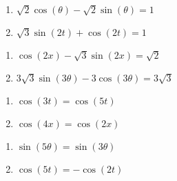 \documentclass{ximera}
\begin{document}
\begin{multicols}{2}

\begin{enumerate}

\setcounter{enumi}{\value{HW}}

\item  $\sqrt{2} \cos(\theta) - \sqrt{2} \sin(\theta) = 1$
\item  $\sqrt{3} \sin(2t) +  \cos(2t) = 1$

\setcounter{HW}{\value{enumi}}

\end{enumerate}

\end{multicols}

\begin{multicols}{2}

\begin{enumerate}

\setcounter{enumi}{\value{HW}}

\item $\cos(2x) - \sqrt{3} \sin(2x) = \sqrt{2}$
\item $3\sqrt{3}\sin(3\theta) - 3\cos(3\theta) = 3\sqrt{3}$

\setcounter{HW}{\value{enumi}}

\end{enumerate}

\end{multicols}

\begin{multicols}{2}

\begin{enumerate}

\setcounter{enumi}{\value{HW}}

\item  $\cos(3t) = \cos(5t)$
\item $\cos(4x) = \cos(2x)$

\setcounter{HW}{\value{enumi}}

\end{enumerate}

\end{multicols}

\begin{multicols}{2}

\begin{enumerate}

\setcounter{enumi}{\value{HW}}

\item $\sin(5\theta) = \sin(3\theta)$
\item $\cos(5t) = -\cos(2t)$

\setcounter{HW}{\value{enumi}}

\end{enumerate}

\end{multicols}
\end{document}

